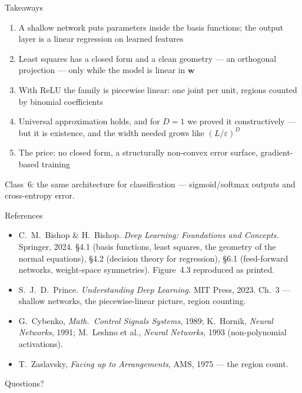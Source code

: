 \documentclass[aspectratio=169, 11pt]{beamer}
\newcommand{\nosrc}{}       %
\begin{document}
\begin{frame}{Takeaways}
  \nosrc
  \vspace{0.1em}
  {\footnotesize
  \begin{enumerate}\setlength{\itemsep}{1pt}
    \item A shallow network puts parameters inside the basis
          functions; the output layer is a \alert{linear regression
          on learned features}
    \item Least squares has a \alert{closed form} and a clean
          geometry --- an orthogonal projection --- only while the
          model is linear in $\mathbf{w}$
    \item With ReLU the family is \alert{piecewise linear}: one
          joint per unit, regions counted by binomial coefficients
    \item \alert{Universal approximation} holds, and for $D=1$ we
          proved it constructively --- but it is existence, and the
          width needed grows like $(L/\varepsilon)^{D}$
    \item The price: \alert{no closed form}, a structurally
          non-convex error surface, gradient-based training
  \end{enumerate}}
  \vspace{0.1em}
  \begin{redhighlight}
    {\footnotesize Class~6: the same architecture for
    \alert{classification} --- sigmoid/softmax outputs and
    cross-entropy error.}
  \end{redhighlight}
\end{frame}

\begin{frame}{References}
  \nosrc
  \footnotesize
  \begin{itemize}\setlength{\itemsep}{3pt}
    \item C.~M.~Bishop \& H.~Bishop. \textit{Deep Learning:
          Foundations and Concepts.} Springer, 2024.
          \S4.1 (basis functions, least squares, the geometry of
          the normal equations), \S4.2 (decision theory for
          regression), \S6.1 (feed-forward networks, weight-space
          symmetries). Figure~4.3 reproduced as printed.
    \item S.~J.~D.~Prince. \textit{Understanding Deep Learning.}
          MIT Press, 2023. Ch.~3 --- shallow networks, the
          piecewise-linear picture, region counting.
    \item G.~Cybenko, \textit{Math.\ Control Signals Systems}, 1989;
          K.~Hornik, \textit{Neural Networks}, 1991;
          M.~Leshno et al., \textit{Neural Networks}, 1993
          (non-polynomial activations).
    \item T.~Zaslavsky, \textit{Facing up to Arrangements}, AMS,
          1975 --- the region count.

  \end{itemize}
\end{frame}

\begin{frame}[standout]
  \nosrc
  Questions?
\end{frame}
\end{document}
